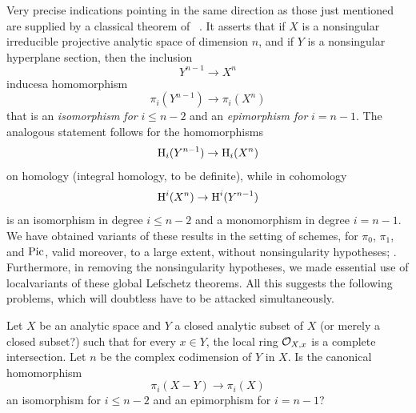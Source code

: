Very precise indications pointing in the same direction as those just
mentioned are supplied by a classical theorem of
~\cite{XIII.7}. It asserts that if $X$ is a
nonsingular irreducible projective analytic space of dimension $n$, and
if $Y$ is a nonsingular hyperplane section, then the inclusion
$$
Y^{n-1}\to X^n
$$
induces\pageoriginale a homomorphism
$$
\pi_i(Y^{n-1})\to \pi_i(X^n)
$$
that is an \emph{isomorphism for} $i\leq n-2$ and an
\emph{epimorphism for} $i=n-1$. The analogous statement follows for the
homomorphisms
$$
\mathrm H_i(Y^{n-1})\to \mathrm H_i(X^n)
$$
on homology (integral homology, to be definite), while in cohomology
$$
\mathrm H^i(X^n)\to\mathrm H^i(Y^{n-1})
$$
is an isomorphism in degree $i\leq n-2$ and a monomorphism in degree
$i=n-1$. We have obtained variants of these results in the setting of
schemes, for $\pi_0$, $\pi_1$, and $\operatorname{Pic}$, valid moreover, to a large
extent, without nonsingularity hypotheses; \cf \Exp {}.
Furthermore, in removing the nonsingularity hypotheses, we made
essential use of \og local\fg variants of these global Lefschetz
theorems. All this suggests the following problems, which will doubtless
have to be attacked simultaneously.

\begin{probleme} \label{XIII.4.1}
Let $X$ be an analytic space and $Y$ a closed analytic subset of $X$
(or merely a closed subset?) such that for every $x\in Y$,
the local ring $\mathcal O_{X,x}$ is a complete intersection. Let $n$ be the complex
codimension of $Y$ in $X$. Is the canonical homomorphism
$$
\pi_i(X-Y)\to \pi_i(X)
$$
an isomorphism for $i\leq n-2$ and an epimorphism for $i=n-1$?
\end{probleme}

